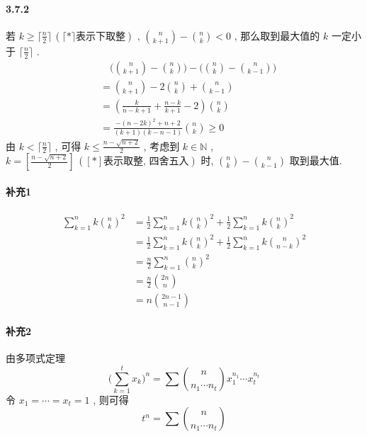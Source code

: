 \documentclass[a4paper, UTF8]{ctexart}				%
\numberwithin{equation}{section}				%
\begin{document}
    \paragraph{3.7.2}\quad 
        若 $k \ge \lceil{\frac{n}{2}}\rceil \, (\lceil{*}\rceil\text{表示下取整})$ , ${{n} \choose {k+1}} - {{n} \choose {k}} < 0$ , 那么取到最大值的 $k$ 一定小于 $\lceil{\frac{n}{2}}\rceil$ . 
        \[
            \begin{split}
                &\quad\biggl({{n} \choose {k+1}} - {{n} \choose {k}}\biggl) 
                - \biggl({{n} \choose {k}} - {{n} \choose {k-1}}\biggl)\\
                & = {{n} \choose {k+1}} - 2{{n} \choose {k}} + {{n} \choose {k - 1}}\\
                & = (\frac{k}{n-k+1} + \frac{n-k}{k+1} -2) {{n} \choose {k}}\\
                & = \frac{-(n-2 k)^2+n+2}{(k+1) (k-n-1)} {{n} \choose {k}} \ge 0
            \end{split}
        \]
        由 $k<\lceil{\frac{n}{2}}\rceil$ , 可得 $k \le \frac{n - \sqrt{n+2}}{2}$ , 考虑到 $k \in \mathbb{N}$ , $k = [\frac{n - \sqrt{n+2}}{2}]\,([*]\text{表示取整, 四舍五入})$ 时, ${{n} \choose {k}} - {{n} \choose {k-1}}$ 取到最大值.
    \paragraph{补充1}\quad 
        \begin{equation*}
            \begin{split}
                \sum^{n}_{k=1} k{n \choose k}^2
                & = \frac{1}{2} \sum^{n}_{k=1} k{n \choose k}^2 + \frac{1}{2} \sum^{n}_{k=1} k{n \choose k}^2\\
                & = \frac{1}{2} \sum^{n}_{k=1} k{n \choose k}^2 + \frac{1}{2} \sum^{n}_{k=1} k{n \choose n - k}^2\\
                & = \frac{n}{2} \sum^{n}_{k=1} {n \choose k}^2\\
                & = \frac{n}{2} {2n \choose n}\\
                & = n {2n-1 \choose n-1}
            \end{split}
        \end{equation*}
    \paragraph{补充2}\quad 
        由多项式定理 
        \[
            \bigg(\sum^{t}_{k=1} x_k\bigg)^n = \sum^{}_{} {n \choose n_1 \cdots n_t}x_1^{n_1} \cdots x_t^{n_t}
        \]
        令 $x_1 = \cdots = x_t = 1$ , 则可得
        $$t^n = \sum^{}_{} {n \choose n_1 \cdots n_t}$$
\end{document}
